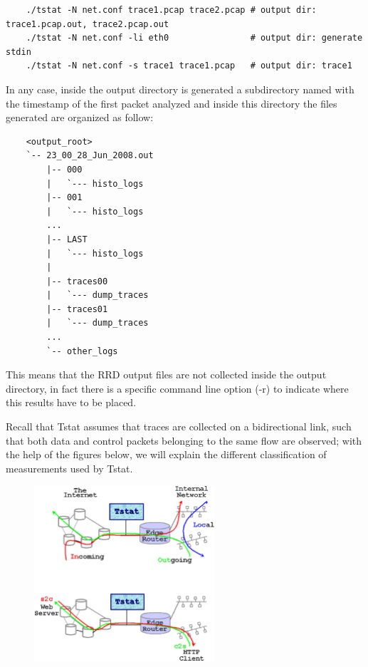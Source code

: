 \documentclass[11pt]{article}
\begin{document}
\begin{small}\begin{verbatim}
    ./tstat -N net.conf trace1.pcap trace2.pcap # output dir: trace1.pcap.out, trace2.pcap.out
    ./tstat -N net.conf -li eth0                # output dir: generate stdin   
    ./tstat -N net.conf -s trace1 trace1.pcap   # output dir: trace1
\end{verbatim}\end{small} \noindent
In any case, inside the output directory is generated a subdirectory named with the
timestamp of the first packet analyzed and inside this directory the files generated
are organized as follow:

\begin{small}\begin{verbatim}
    <output_root>
    `-- 23_00_28_Jun_2008.out
        |-- 000
        |   `--- histo_logs
        |-- 001
        |   `--- histo_logs
        ...
        |-- LAST
        |   `--- histo_logs
        |
        |-- traces00
        |   `--- dump_traces
        |-- traces01
        |   `--- dump_traces
        ...
        `-- other_logs
\end{verbatim}\end{small} \noindent
This means that the RRD output files are not collected inside the output directory, 
in fact there is a specific command line option (-r) to indicate where this results 
have to be placed.



Recall that Tstat assumes that traces are collected on a bidirectional link,
such that both data and control packets belonging to the same flow are observed;
with the help of the figures below, we will explain the different classification
of measurements used by Tstat.



         \begin{figure}[!htb]
             \begin{center}
                 \includegraphics[width=0.6\textwidth]{tstat_output.eps}
             \end{center}
         \end{figure}
\end{document}
